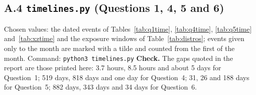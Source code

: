 \documentclass[11pt,a4paper]{article}
\begin{document}
\clearpage
\needspace{18cm}
\subsection*{A.4 \texttt{timelines.py} (Questions 1, 4, 5 and 6)}
Chosen values: the dated events of Tables~\ref{tab:q1time}, \ref{tab:q4time}, \ref{tab:q5time} and~\ref{tab:xztime} and the exposure windows of
Table~\ref{tab:distros}; events given only to the month are marked with a tilde and counted from the first of the month. Command: \texttt{python3 timelines.py}
\needspace{17cm}
\textbf{Check.} The gaps quoted in the report are those printed here: 3.7 hours, 8.5 hours and about 5 days for Question~1; 519 days, 818 days and one day for Question~4;
31, 26 and 188 days for Question~5; 882 days, 343 days and 34 days for Question~6.
\end{document}
